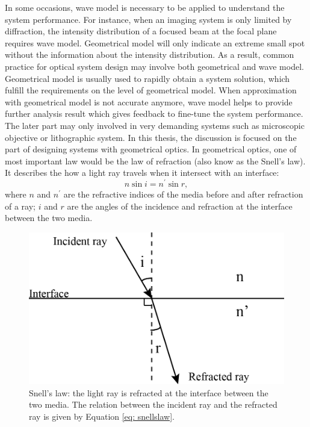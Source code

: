 In some occasions, wave model is necessary to be applied to understand the system performance. For instance, when an imaging system is only limited by diffraction, the intensity distribution of a focused beam at the focal plane requires wave model. Geometrical model will only indicate an extreme small spot without the information about the intensity distribution. As a result, common practice for optical system design may involve both geometrical and wave model. Geometrical model is usually used to rapidly obtain a system solution, which fulfill the requirements on the level of geometrical model. When approximation with geometrical model is not accurate anymore, wave model helps to provide further analysis result which gives feedback to fine-tune the system performance. The later part may only involved in very demanding systems such as microscopic objective or lithographic system. In this thesis, the discussion is focused on the part of designing systems with geometrical optics. 
%
In geometrical optics, one of most important law would be the law of refraction (also know as the Snell's law). It describes the how a light ray travels when it intersect with an interface:
\begin{equation}
n \sin i = n^\prime \sin r,
\label{eq: snellslaw}
\end{equation}where $n$ and $n^\prime$ are the refractive indices of the media before and after refraction of a ray; $i$ and $r$ are the angles of the incidence and refraction at the interface between the two media.
\begin{figure}
    \centering
    \includegraphics[scale=0.58]{chapter-1/figures/snellslaw.png}
    \caption{Snell's law: the light ray is refracted at the interface between the two media. The relation between the incident ray and the refracted ray is given by Equation \ref{eq: snellslaw}.}
    \label{fig: snellslaw}
\end{figure} 


